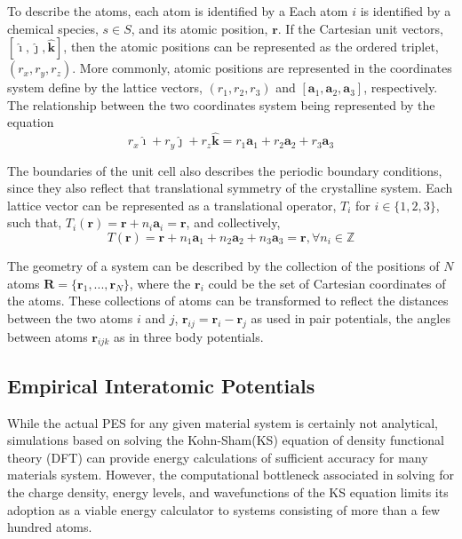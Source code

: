 To describe the atoms, each atom is identified by a
Each atom $i$ is identified by a chemical species, $s\in S$, and its atomic position, $\bm{r}$.
If the Cartesian unit vectors,$[\hat{\bm{\imath}},\hat{\bm{\jmath}},\hat{\bm{k}}]$, then the atomic positions can be represented as the ordered triplet, $(r_x,r_y,r_z)$.
More commonly, atomic positions are represented in the coordinates system define by the lattice vectors, $(r_1,r_2,r_3)$ and $[\bm{a}_1,\bm{a}_2,\bm{a}_3]$, respectively.
The relationship between the two coordinates system being represented by the equation
\begin{equation}
	r_x \hat{\bm{\imath}} + r_y \hat{\bm{\jmath}} + r_z \hat{\bm{k}}
	=
	r_1 \bm{a}_1 + r_2 \bm{a}_2 + r_3 \bm{a}_3
\end{equation}

The boundaries of the unit cell also describes the periodic boundary conditions, since they also reflect that translational symmetry of the crystalline system.
Each lattice vector can be represented as a translational operator, $T_i$ for ${i\in\{1,2,3\}}$, such that, $T_i(\bm{r})=\bm{r} + n_i \bm{a}_i = \bm{r}$, and collectively,
\begin{equation}
    T(\bm{r}) = \bm{r}
		    + n_1 \bm{a}_1
		    + n_2 \bm{a}_2
		    + n_3 \bm{a}_3 = \bm{r}, \forall n_i \in \mathbb{Z}
\end{equation}

The geometry of a system can be described by the collection of the positions of $N$ atoms
	$\bm{R} = \{\bm{r}_1,...,\bm{r}_N\}$,
	where the $\bm{r}_i$ could be the set of Cartesian coordinates of the atoms.
These collections of atoms can be transformed to reflect the distances between the two atoms $i$ and $j$,
	$\bm{r}_{ij}=\bm{r}_i - \bm{r}_j$
	as used in pair potentials, the angles between atoms $\bm{r}_{ijk}$ as in three body potentials.
\\
\subsection{Empirical Interatomic Potentials}

While the actual PES for any given material system is certainly not analytical, simulations based on solving the Kohn-Sham(KS) equation of density functional theory (DFT) can provide energy calculations of sufficient accuracy for many materials system.  However, the computational bottleneck associated in solving for the charge density, energy levels, and wavefunctions of the KS equation limits its adoption as a viable energy calculator to systems consisting of more than a few hundred atoms.

